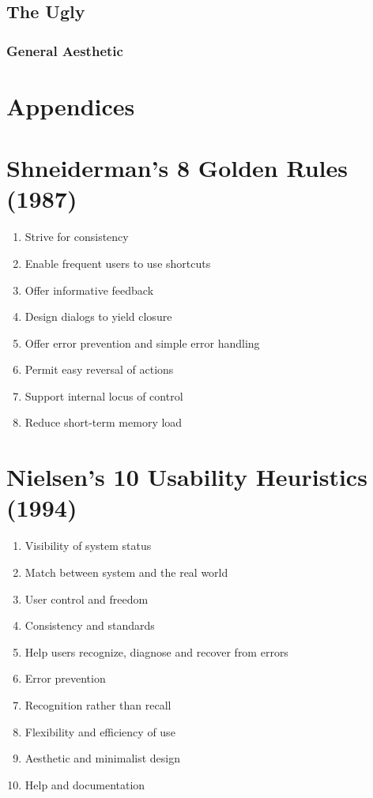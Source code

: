 \documentclass[a4paper,11pt,oneside]{article}
\begin{document}
\subsection{The Ugly}
\subsubsection{General Aesthetic}

\section{Appendices}
\appendix
\section{Shneiderman’s 8 Golden Rules (1987)}
\begin{enumerate}
\item Strive for consistency
\item Enable frequent users to use shortcuts
\item Offer informative feedback
\item Design dialogs to yield closure
\item Offer error prevention and simple error handling
\item Permit easy reversal of actions
\item Support internal locus of control
\item Reduce short-term memory load 
\end{enumerate}
\section{Nielsen’s 10 Usability Heuristics (1994)}
\begin{enumerate}
\item Visibility of system status
\item Match between system and the real world
\item User control and freedom
\item Consistency and standards
\item Help users recognize, diagnose and recover from errors
\item Error prevention
\item Recognition rather than recall
\item Flexibility and efficiency of use
\item Aesthetic and minimalist design
\item Help and documentation
\end{enumerate}
\end{document}
